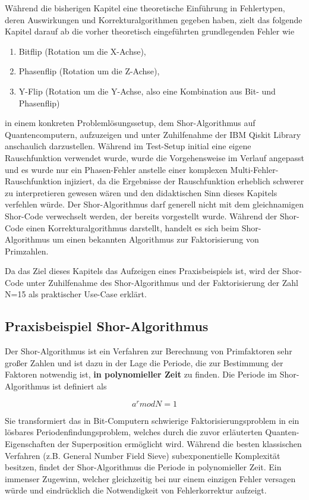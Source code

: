 Während die bisherigen Kapitel eine theoretische Einführung in Fehlertypen, deren Auswirkungen und Korrekturalgorithmen gegeben haben, zielt das folgende Kapitel darauf ab die vorher theoretisch eingeführten grundlegenden Fehler wie 
\begin{enumerate}
    \item Bitflip (Rotation um die X-Achse),
    \item Phasenflip (Rotation um die Z-Achse),
    \item Y-Flip (Rotation um die Y-Achse, also eine Kombination aus Bit- und Phasenflip)
\end{enumerate}
in einem konkreten Problemlösungssetup, dem Shor-Algorithmus auf Quantencomputern, aufzuzeigen und unter Zuhilfenahme der IBM Qiskit Library anschaulich darzustellen.
\medskip
Während im Test-Setup initial eine eigene Rauschfunktion verwendet wurde, wurde die Vorgehensweise im Verlauf angepasst und es wurde nur ein Phasen-Fehler anstelle einer komplexen Multi-Fehler-Rauschfunktion injiziert, da die Ergebnisse der Rauschfunktion erheblich schwerer zu interpretieren gewesen wären und den didaktischen Sinn dieses Kapitels verfehlen würde.
\medskip
Der Shor-Algorithmus darf generell nicht mit dem gleichnamigen Shor-Code verwechselt werden, der bereits vorgestellt wurde. Während der Shor-Code einen Korrekturalgorithmus darstellt, handelt es sich beim Shor-Algorithmus um einen bekannten Algorithmus zur Faktorisierung von Primzahlen.

Da das Ziel dieses Kapitels das Aufzeigen eines Praxisbeispiels ist, wird der Shor-Code unter Zuhilfenahme des Shor-Algorithmus und der Faktorisierung der Zahl N=15 als praktischer Use-Case erklärt.

\subsection{Praxisbeispiel Shor-Algorithmus}
Der Shor-Algorithmus ist ein Verfahren zur Berechnung von Primfaktoren sehr großer Zahlen und ist dazu in der Lage die Periode, die zur Bestimmung der Faktoren notwendig ist, \textbf{in polynomieller Zeit} zu finden.
Die Periode im Shor-Algorithmus ist definiert als

\begin{equation}
    a^r mod N = 1
\end{equation}

Sie transformiert das in Bit-Computern schwierige Faktorisierungsproblem in ein lösbares Periodenfindungsproblem, welches durch die zuvor erläuterten Quanten-Eigenschaften der Superposition ermöglicht wird.
Während die besten klassischen Verfahren (z.B. General Number Field Sieve) subexponentielle Komplexität besitzen, findet der Shor-Algorithmus die Periode in polynomieller Zeit. Ein immenser Zugewinn, welcher gleichzeitig bei nur einem einzigen Fehler versagen würde und eindrücklich die Notwendigkeit von Fehlerkorrektur aufzeigt.


